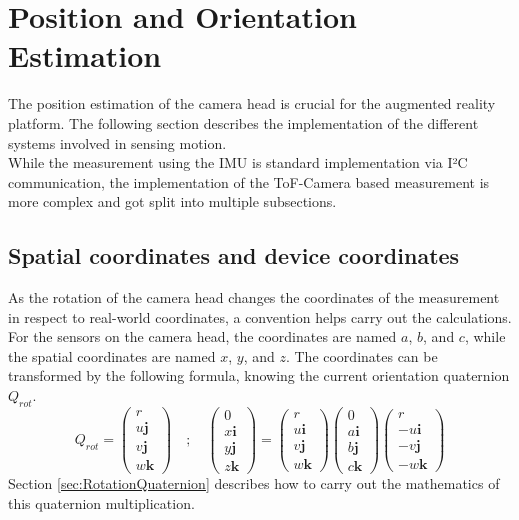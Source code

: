 \section{Position and Orientation Estimation}
\label{sec:PositionEstimate}
The position estimation of the camera head is crucial for the augmented reality platform. The following section describes the implementation of the different systems involved in sensing motion.\\
While the measurement using the IMU is standard implementation via I²C communication, the implementation of the ToF-Camera based measurement is more complex and got split into multiple subsections. 
\subsection{Spatial coordinates and device coordinates}
\label{sec:ABC_XYZ_coords}
As the rotation of the camera head changes the coordinates of the measurement in respect to real-world coordinates, a convention helps carry out the calculations. For the sensors on the camera head, the coordinates are named $a$, $b$, and $c$, while the spatial coordinates are named $x$, $y$, and $z$.
The coordinates can be transformed by the following formula, knowing the current orientation quaternion $Q_{rot}$.   
\begin{equation*}
    Q_{rot}
    =
    \begin{pmatrix}
        r           \\
        u\textbf{j} \\
        v\textbf{j} \\
        w\textbf{k}
    \end{pmatrix}
    \quad ; \quad
    \begin{pmatrix}
        0           \\
        x\textbf{i} \\
        y\textbf{j} \\
        z\textbf{k}
    \end{pmatrix}
    =
    \begin{pmatrix}
        r           \\
        u\textbf{i} \\
        v\textbf{j} \\
        w\textbf{k}
    \end{pmatrix}
    \begin{pmatrix}
        0           \\
        a\textbf{i} \\
        b\textbf{j} \\
        c\textbf{k}
    \end{pmatrix}
    \begin{pmatrix}
        r           \\
        -u\textbf{i} \\
        -v\textbf{j} \\
        -w\textbf{k}
    \end{pmatrix}
\end{equation*}
Section \ref{sec:RotationQuaternion} describes how to carry out the mathematics of this quaternion multiplication. 
